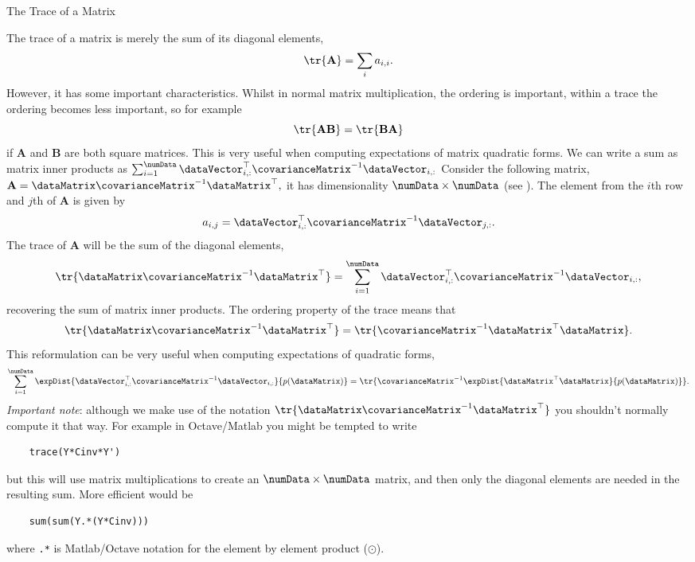 \begin{boxfloat}
  \caption{The Trace of a Matrix}\label{box:trace}

  \boxfontsize The trace of a matrix is merely the sum of its diagonal
  elements,
  \[
  \tr{\mathbf{A}} = \sum_{i} a_{i,i}.
  \]
  However, it has some important characteristics. Whilst in normal
  matrix multiplication, the ordering is important, within a trace the
  ordering becomes less important, so for example
  \[
  \tr{\mathbf{A}\mathbf{B}} = \tr{\mathbf{B}\mathbf{A}}
  \]
  if $\mathbf{A}$ and $\mathbf{B}$ are both square matrices. This is
  very useful when computing expectations of matrix quadratic
  forms. We can write a sum as matrix inner products as $
  \sum_{i=1}^\numData \dataVector_{i,
    :}^\top\covarianceMatrix^{-1}\dataVector_{i, :} $ Consider the
  following matrix, $ \mathbf{A} =
  \dataMatrix\covarianceMatrix^{-1}\dataMatrix^\top, $ it has
  dimensionality $\numData \times \numData$ (see
  ). The element from the $i$th row
  and $j$th of $\mathbf{A}$ is given by
  \[
  a_{i, j} = \dataVector_{i, :}^\top\covarianceMatrix^{-1}\dataVector_{j, :}.
  \]
  The trace of $\mathbf{A}$  will be the sum of the diagonal elements, 
  \[
  \tr{\dataMatrix\covarianceMatrix^{-1}\dataMatrix^\top } = \sum_{i=1}^\numData \dataVector_{i, :}^\top\covarianceMatrix^{-1}\dataVector_{i, :},
  \]
  recovering the sum of matrix inner products. The ordering property
  of the trace means that
  \[
  \tr{\dataMatrix\covarianceMatrix^{-1}\dataMatrix^\top } =
  \tr{\covarianceMatrix^{-1}\dataMatrix^\top\dataMatrix}.
  \]
  This reformulation can be very useful when computing expectations of
  quadratic forms,
  \[
  \sum_{i=1}^\numData \expDist{\dataVector_{i,
      :}^\top\covarianceMatrix^{-1}\dataVector_{i, :}}{p(\dataMatrix)}
  = \tr{\covarianceMatrix^{-1} \expDist{\dataMatrix^\top
      \dataMatrix}{p(\dataMatrix)}}.
  \]
  \emph{Important note}: although we make use of the notation
  $\tr{\dataMatrix\covarianceMatrix^{-1}\dataMatrix^\top}$ you
  shouldn't normally compute it that way. For example in Octave/Matlab
  you might be tempted to write \lstset{language=Matlab}
  \begin{lstlisting}
    trace(Y*Cinv*Y')
  \end{lstlisting}
  but this will use matrix multiplications to create an $\numData
  \times \numData$ matrix, and then only the diagonal elements are
  needed in the resulting sum.  More efficient would be
  \begin{lstlisting}
    sum(sum(Y.*(Y*Cinv)))
  \end{lstlisting}
  where \lstinline!.*! is Matlab/Octave notation for the element by
  element product ($\odot$). 
\end{boxfloat}

